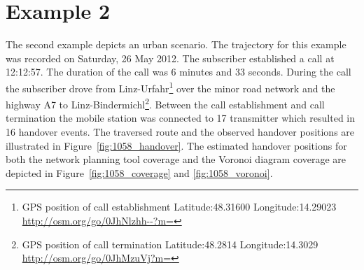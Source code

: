 \documentclass[master,english]{hgbthesis}
\begin{document}
\section{Example 2}
The second example depicts an urban scenario. The trajectory for this example was recorded on Saturday, 26 May 2012. The subscriber established a call at 12:12:57. The duration of the call was 6 minutes and 33 seconds. During the call the subscriber drove from Linz-Urfahr\footnote{GPS position of call establishment Latitude:48.31600 Longitude:14.29023 \url{http://osm.org/go/0JhNlzhh--?m=}} over the minor road network and the highway A7 to Linz-Bindermichl\footnote{GPS position of call termination Latitude:48.2814 Longitude:14.3029 \url{http://osm.org/go/0JhMzuVj?m=}}. Between the call establishment and call termination the mobile station was connected to 17 transmitter which resulted in 16 handover events. The traversed route and the observed handover positions are illustrated in Figure~\ref{fig:1058_handover}. The estimated handover positions for both the network planning tool coverage and the Voronoi diagram coverage are depicted in Figure~\ref{fig:1058_coverage} and \ref{fig:1058_voronoi}.
\end{document}
